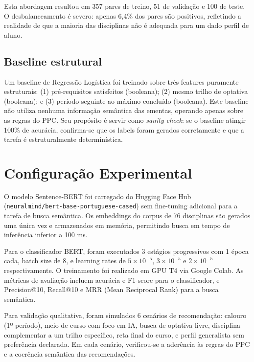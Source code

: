 \documentclass[12pt,a4paper]{article}
\begin{document}
Esta abordagem resultou em 357 pares de treino, 51 de validação e 100 de teste. O desbalanceamento é severo: apenas 6,4\% dos pares são positivos, refletindo a realidade de que a maioria das disciplinas não é adequada para um dado perfil de aluno.

\subsection{Baseline estrutural}

Um baseline de Regressão Logística foi treinado sobre três features puramente estruturais: (1) pré-requisitos satisfeitos (booleana); (2) mesmo trilho de optativa (booleana); e (3) período seguinte ao máximo concluído (booleana). Este baseline não utiliza nenhuma informação semântica das ementas, operando apenas sobre as regras do PPC. Seu propósito é servir como \textit{sanity check}: se o baseline atingir 100\% de acurácia, confirma-se que os labels foram gerados corretamente e que a tarefa é estruturalmente determinística.

\section{Configuração Experimental}

O modelo Sentence-BERT foi carregado do Hugging Face Hub~\cite{wolf2020transformers} (\texttt{neuralmind/bert-base-portuguese-cased}) sem fine-tuning adicional para a tarefa de busca semântica. Os embeddings do corpus de 76 disciplinas são gerados uma única vez e armazenados em memória, permitindo busca em tempo de inferência inferior a 100 ms.

Para o classificador BERT, foram executados 3 estágios progressivos com 1 época cada, batch size de 8, e learning rates de $5\times10^{-5}$, $3\times10^{-5}$ e $2\times10^{-5}$ respectivamente. O treinamento foi realizado em GPU T4 via Google Colab. As métricas de avaliação incluem acurácia e F1-score para o classificador, e Precision@10, Recall@10 e MRR (Mean Reciprocal Rank) para a busca semântica.

Para validação qualitativa, foram simulados 6 cenários de recomendação: calouro (1º período), meio de curso com foco em IA, busca de optativa livre, disciplina complementar a um trilho específico, reta final do curso, e perfil generalista sem preferência declarada. Em cada cenário, verificou-se a aderência às regras do PPC e a coerência semântica das recomendações.
\end{document}
